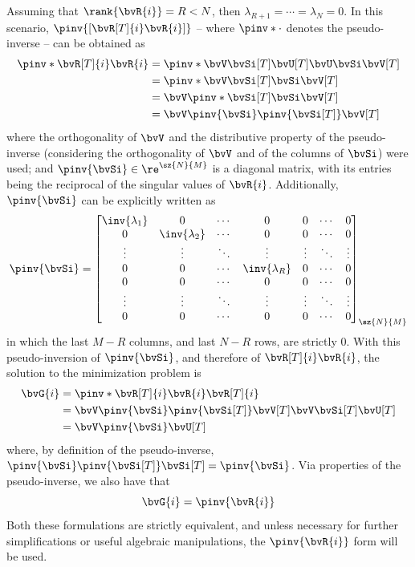 {Assuming that $\rank{\bvR{i}} = R < N$, then $\lambda_{R+1} = \cdots = \lambda_{N} = 0$. In this scenario, $\pinv{[\bvR[T]{i} \bvR{i}]}$ -- where $\pinv*{\cdot}$ denotes the pseudo-inverse -- can be obtained as
\begin{equation}
	\begin{split}
		\pinv*{\bvR[T]{i} \bvR{i}}
		& = \pinv*{\bvV \bvSi[T] \bvU[T] \bvU \bvSi \bvV[T]} \\
		& = \pinv*{\bvV \bvSi[T] \bvSi \bvV[T]} \\
		& = \bvV \pinv*{\bvSi[T] \bvSi} \bvV[T] \\
		& = \bvV \pinv{\bvSi} \pinv{{\bvSi[T]}} \bvV[T]
	\end{split}
\end{equation}
where the orthogonality of $\bvV$ and the distributive property of the pseudo-inverse (considering the orthogonality of $\bvV$ and of the columns of $\bvSi$) were used; and $\pinv{\bvSi} \in\re^{\sz{N}{M}}$ is a diagonal matrix, with its entries being the reciprocal of the singular values of $\bvR{i}$. Additionally, $\pinv{\bvSi}$ can be explicitly written as
\begin{equation}
	\pinv{\bvSi} = \begin{bmatrix}
		\inv{\lambda_1} & 0 				& \cdots & 0 				& 0 	 & \cdots & 0 \\
		0 				& \inv{\lambda_2} 	& \cdots & 0 				& 0 	 & \cdots & 0 \\
		\vdots 			& \vdots 			& \ddots & \vdots 			& \vdots & \ddots & \vdots \\
		0 				& 0 				& \cdots & \inv{\lambda_R}	& 0 	 & \cdots & 0 \\
		0				& 0					& \cdots & 0 				& 0		 & \cdots & 0 \\
		\vdots 			& \vdots 			& \ddots & \vdots 			& \vdots & \ddots & \vdots \\
		0				& 0					& \cdots & 0 				& 0		 & \cdots & 0
	\end{bmatrix}_{\sz{N}{M}}
\end{equation}
in which the last $M-R$ columns, and last $N-R$ rows, are strictly $0$. With this pseudo-inversion of $\pinv{\bvSi}$, and therefore of $\bvR[T]{i} \bvR{i}$, the solution to the minimization problem is
\begin{equation}
	\begin{split}
		\bvG{i}
		& = \pinv*{\bvR[T]{i} \bvR{i}} \bvR[T]{i} \\
		& = \bvV \pinv{\bvSi} \pinv{{\bvSi[T]}} \bvV[T] \bvV \bvSi[T] \bvU[T] \\
		& = \bvV \pinv{\bvSi} \bvU[T]
	\end{split}
	\label{eq:sec2:solution-G_pseudo-inverse}
\end{equation}
where, by definition of the pseudo-inverse, $\pinv{\bvSi} \pinv{{\bvSi[T]}} \bvSi[T] = \pinv{\bvSi}$. Via properties of the pseudo-inverse, we also have that
\begin{equation}
	\bvG{i} = \pinv{\bvR{i}}
	\label{eq:sec2:solution-G_pseudo-inverse_shortform}
\end{equation}
Both these formulations are strictly equivalent, and unless necessary for further simplifications or useful algebraic manipulations, the $\pinv{\bvR{i}}$ form will be used.

}
